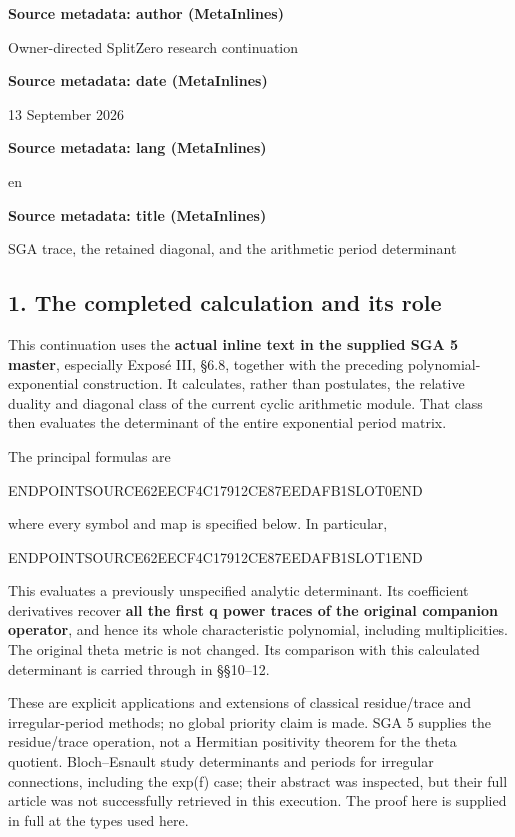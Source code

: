 \textbf{Source metadata: author (MetaInlines)}

Owner-directed SplitZero research continuation

\textbf{Source metadata: date (MetaInlines)}

13 September 2026

\textbf{Source metadata: lang (MetaInlines)}

en

\textbf{Source metadata: title (MetaInlines)}

SGA trace, the retained diagonal, and the arithmetic period determinant

\subsection{1. The completed calculation and its role}\label{endpoint-sga_trace_period--the-completed-calculation-and-its-role}

This continuation uses the \textbf{actual inline text in the supplied SGA 5 master}, especially Exposé III, §6.8, together with the preceding polynomial-exponential construction. It calculates, rather than postulates, the relative duality and diagonal class of the current cyclic arithmetic module. That class then evaluates the determinant of the entire exponential period matrix.

The principal formulas are

ENDPOINTSOURCE62EECF4C17912CE87EEDAFB1SLOT0END

where every symbol and map is specified below. In particular,

ENDPOINTSOURCE62EECF4C17912CE87EEDAFB1SLOT1END

This evaluates a previously unspecified analytic determinant. Its coefficient derivatives recover \textbf{all the first q power traces of the original companion operator}, and hence its whole characteristic polynomial, including multiplicities. The original theta metric is not changed. Its comparison with this calculated determinant is carried through in §§10--12.

These are explicit applications and extensions of classical residue/trace and irregular-period methods; no global priority claim is made. SGA 5 supplies the residue/trace operation, not a Hermitian positivity theorem for the theta quotient. Bloch--Esnault study determinants and periods for irregular connections, including the exp(f) case; their abstract was inspected, but their full article was not successfully retrieved in this execution. The proof here is supplied in full at the types used here.

